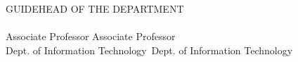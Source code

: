 \begin{titlepage}
\vspace{2cm}


\noindent GUIDE\hfill HEAD OF THE DEPARTMENT\\
\cGuide \hfill \cHod \\
Associate Professor \hfill Associate Professor\\
Dept. of Information Technology\ \hfill Dept. of Information Technology\\

\end{titlepage}


